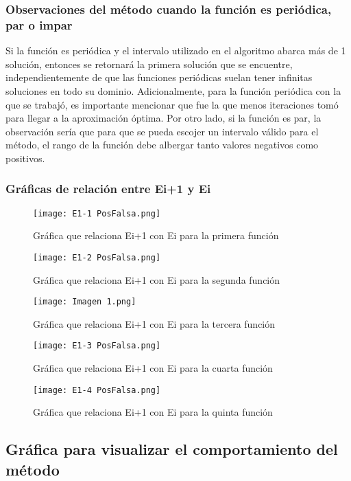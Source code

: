 \documentclass{article}
\begin{document}
\subsubsection{Observaciones del método cuando la función es periódica, par o impar}
Si la función es periódica y el intervalo utilizado en el algoritmo abarca más de 1 solución, entonces se retornará la primera solución que se encuentre, independientemente de que las funciones periódicas suelan tener infinitas soluciones en todo su dominio. Adicionalmente, para la función periódica con la que se trabajó, es importante mencionar que fue la que menos iteraciones tomó para llegar a la aproximación óptima. Por otro lado, si la función es par, la observación sería que para que se pueda escojer un intervalo válido para el método, el rango de la función debe albergar tanto valores negativos como positivos.

\subsubsection{Gráficas de relación entre Ei+1 y Ei}

\begin{figure}[H]
    \centering
    \texttt{[image: E1-1 PosFalsa.png]}
    \caption{Gráfica que relaciona Ei+1 con Ei para la primera función}
    \label{fig:E1-1 PosFalsa}
\end{figure}
\begin{figure}[H]
    \centering
    \texttt{[image: E1-2 PosFalsa.png]}
    \caption{Gráfica que relaciona Ei+1 con Ei para la segunda función}
    \label{fig:E1-2 PosFalsa}
\end{figure}
\begin{figure}[H]
    \centering
    \texttt{[image: Imagen 1.png]}
    \caption{Gráfica que relaciona Ei+1 con Ei para la tercera función}
    \label{fig:E1-2 PosFalsa}
\end{figure}
\begin{figure}[H]
    \centering
    \texttt{[image: E1-3 PosFalsa.png]}
    \caption{Gráfica que relaciona Ei+1 con Ei para la cuarta función}
    \label{fig:E1-3 PosFalsa}
\end{figure}
\begin{figure}[H]
    \centering
    \texttt{[image: E1-4 PosFalsa.png]}
    \caption{Gráfica que relaciona Ei+1 con Ei para la quinta función}
    \label{fig:E1-4 PosFalsa}
\end{figure}

\subsection{Gráfica para visualizar el comportamiento del método}
\end{document}
